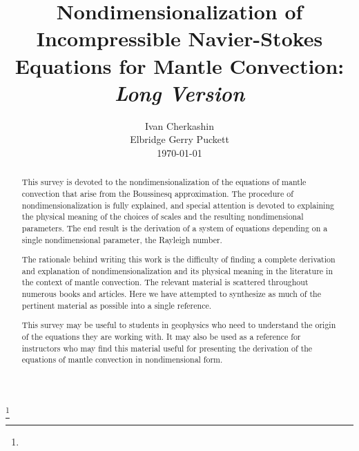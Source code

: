 \documentclass[oneside]{amsbook}
\theoremstyle{definition}
\theoremstyle{remark}
\numberwithin{section}{chapter}
\numberwithin{equation}{chapter}
\begin{document}
\frontmatter

\title{Nondimensionalization of Incompressible Navier-Stokes Equations for Mantle Convection: \\ \textit{Long Version}} 


\author{Ivan Cherkashin \\ Elbridge Gerry Puckett \\ \today}
\curraddr{}

\address{}
\curraddr{}
\thanks{}




\begin{abstract}

This survey is devoted to the nondimensionalization of the equations of mantle convection that arise from the Boussinesq approximation. The procedure of nondimensionalization is fully explained, and special attention is devoted to explaining the physical meaning of the choices of scales and the resulting nondimensional parameters. The end result is the derivation of a system of equations depending on a single nondimensional parameter, the Rayleigh number.

The rationale behind writing this work is the difficulty of finding a complete derivation and explanation of nondimensionalization and its physical meaning in the literature in the context of mantle convection. The relevant material is scattered throughout numerous books and articles. Here we have attempted to synthesize as much of the pertinent material as possible into a single reference.

This survey may be useful to students in geophysics who need to understand the origin of the equations they are working with. It may also be used as a reference for instructors who may find this material useful for presenting the derivation of the equations of mantle convection in nondimensional form.   

\end{abstract}

\maketitle
\end{document}
